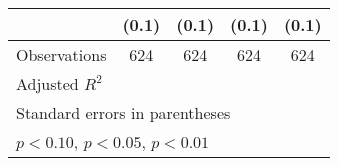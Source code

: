 \begin{table}[htbp]
\begin{tabular}{l*{4}{c}}
                &    (0.1)         &    (0.1)         &    (0.1)         &    (0.1)         \\
\hline
Observations    &      624         &      624         &      624         &      624         \\
Adjusted \(R^{2}\)&                  &                  &                  &                  \\
\hline\hline
\multicolumn{5}{l}{\footnotesize Standard errors in parentheses}\\
\multicolumn{5}{l}{\footnotesize \sym{*} \(p<0.10\), \sym{**} \(p<0.05\), \sym{***} \(p<0.01\)}\\
\end{tabular}
\end{table}

